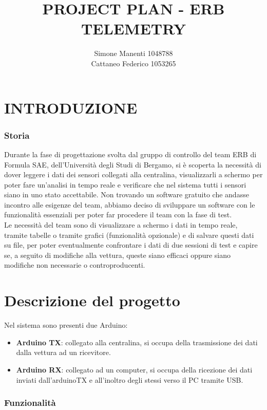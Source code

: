 \documentclass{report}
\title{PROJECT PLAN - ERB TELEMETRY}
\author{Simone Manenti 1048788\\ Cattaneo Federico 1053265}
\begin{document}
\maketitle

\chapter{INTRODUZIONE}
\subsection{Storia}
Durante la fase di progettazione svolta dal gruppo di controllo del team ERB di Formula SAE, dell'Università degli Studi di Bergamo, si è scoperta la necessità di dover leggere i dati dei sensori collegati alla centralina, visualizzarli a schermo per poter fare un'analisi in tempo reale e verificare che nel sistema tutti i sensori siano in uno stato accettabile.
Non trovando un software gratuito che andasse incontro alle esigenze del team, abbiamo deciso di sviluppare un software con le funzionalità essenziali per poter far procedere il team con la fase di test.
\\
Le necessità del team sono di visualizzare a schermo i dati in tempo reale, tramite tabelle o tramite grafici (funzionalità opzionale) e di salvare questi dati su file, per poter eventualmente confrontare i dati di due sessioni di test e capire se, a seguito di modifiche alla vettura, queste siano efficaci oppure siano modifiche non necessarie o controproducenti.


\chapter{Descrizione del progetto}
Nel sistema sono presenti due Arduino:
\begin{itemize}
\item \textbf{Arduino TX}: collegato alla centralina, si occupa della trasmissione dei dati dalla vettura ad un ricevitore.
\item \textbf{Arduino RX}: collegato ad un computer, si occupa della ricezione dei dati inviati dall'arduinoTX e all'inoltro degli stessi verso il PC tramite USB.
\end{itemize}

\subsection{Funzionalità}
\end{document}
